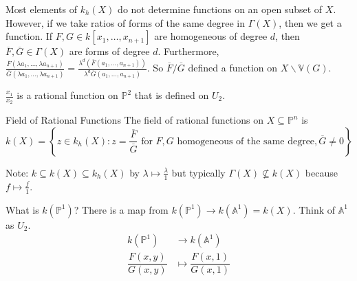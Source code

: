 \documentclass{report}
\begin{document}
Most elements of $k_{h}(X)$ do not determine functions on an open subset of $X$. However, if we take ratios of forms of the same degree in $\Gamma (X)$, then we get a function. If $F, G \in k[x_{1}, \ldots, x_{n + 1}]$ are homogeneous of degree $d$, then $\overline{F}, \overline{G} \in \Gamma (X)$ are forms of degree $d$. Furthermore, $\frac{\overline{F}(\lambda a_{1}, \ldots, \lambda a_{n + 1})}{\overline{G}(\lambda a_{1}, \ldots, \lambda a_{n + 1})} = \frac{\lambda^{d}(\overline{F}(a_{1}, \ldots, a_{n + 1}))}{\lambda^{d}\overline{G}(a_{1}, \ldots, a_{n + 1})}$. So $\overline{F}/\overline{G}$ defined a function on $X \backslash \mathbb{V}(G)$.

\begin{examples}
    \begin{example}
        $\frac{x_{1}}{x_{2}}$ is a rational function on $\mathbb{P}^{2}$ that is defined on $U_{2}$.
    \end{example}
\end{examples}

\begin{definition}{Field of Rational Functions}
    The field of rational functions on $X \subseteq \mathbb{P}^{n}$ is 
        \begin{equation*}
            k(X) = \left\{z \in k_{h}(X) : z = \dfrac{\overline{F}}{\overline{G}} \text{ for $F, G$ homogeneous of the same degree}, \overline{G} \neq 0\right\}
        \end{equation*}
\end{definition}

Note: $k\subseteq k(X) \subseteq k_{h}(X)$ by $\lambda \mapsto \frac{\lambda}{ 1}$ but typically $\Gamma (X) \not\subseteq k(X)$ because $f \mapsto\frac{f}{1}$.

\begin{examples}
    \begin{example}
        What is $k(\mathbb{P}^{1})$? There is a map from $k(\mathbb{P}^{1}) \rightarrow k(\mathbb{A}^{1}) = k(X)$. Think of $\mathbb{A}^{1}$ as $U_{2}$.
            \begin{align*}
                k(\mathbb{P}^{1})        &\rightarrow  k(\mathbb{A}^{1})       \\
                \dfrac{F(x, y)}{G(x, y)} &\mapsto     \dfrac{F(x, 1)}{G(x, 1)}   
            \end{align*}

    \end{example}
\end{examples}
\end{document}
